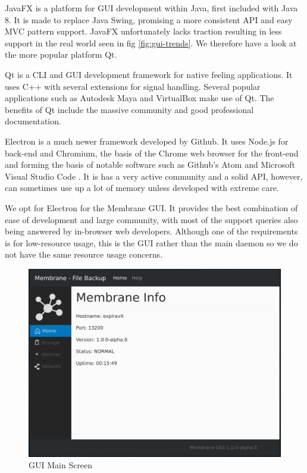 \documentclass[11pt, a4paper, twocolumn, twoside]{report}
\begin{document}
JavaFX is a platform for GUI development within Java, first included with Java 8. It is made to replace Java Swing, promising a more consistent API and easy MVC pattern support. JavaFX unfortunately lacks traction resulting in less support in the real world seen in fig \ref{fig:gui-trends}. We therefore have a look at the more popular platform Qt.

Qt is a CLI and GUI development framework for native feeling applications. It uses C++ with several extensions for signal handling. Several popular applications such as Autodesk Maya and VirtualBox \citep*{oracle2017logging, autodesk2017qt} make use of Qt. The benefits of Qt include the massive community and good professional documentation. \citep{slant2017qtelectron}

Electron is a much newer framework developed by Github. It uses Node.js for back-end and Chromium, the basis of the Chrome web browser for the front-end and forming the basis of notable software such as Github's Atom and Microsoft Visual Studio Code \citep{james2015vselectron}. It is has a very active community and a solid API, however, can sometimes use up a lot of memory unless developed with extreme care.

We opt for Electron for the Membrane GUI. It provides the best combination of ease of development and large community, with most of the support queries also being answered by in-browser web developers. Although one of the requirements is for low-resource usage, this is the GUI rather than the main daemon so we do not have the same resource usage concerns.

\begin{figure}[!ht]
 \centering
 \includegraphics[width=\textwidth]{gui-main}
 \caption{GUI Main Screen}
 \label{fig:gui-main}
\end{figure}
\end{document}
